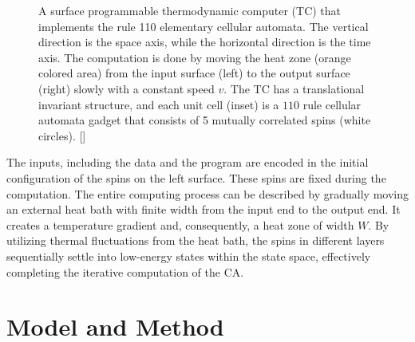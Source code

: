\documentclass[twocolumn,superscriptaddress,english,showpacs,longbibliography]{revtex4-2}
\newcommand{\jinguo}[1]{[{\color{blue}{JGL: #1}}]}
\begin{document}
\begin{figure}[h]
    \caption{A surface programmable thermodynamic computer (TC) that implements the rule 110 elementary cellular automata. The vertical direction is the space axis,
    while the horizontal direction is the time axis.
    The computation is done by moving the heat zone (orange colored area) from the input surface (left) to the output surface (right) slowly with a constant speed $v$.
    The TC has a translational invariant structure, and each unit cell (inset) is a $110$ rule cellular automata gadget that consists of 5 mutually correlated spins (white circles).
    \jinguo{please add symbols for space, time and width}}
    \label{Surface-programmable-thermodynamic computer}
\end{figure}

The inputs, including the data and the program are encoded in the initial configuration of the spins on the left surface. These spins are fixed during the computation.
The entire computing process can be described by gradually moving an external heat bath with finite width from the input end to the output end.
It creates a temperature gradient and, consequently, a heat zone of width $W$. By utilizing thermal fluctuations from the heat bath, the spins in different layers sequentially settle into low-energy states within the state space, effectively completing the iterative computation of the CA.


\section{Model and Method}\label{sec:model-method}
\end{document}
